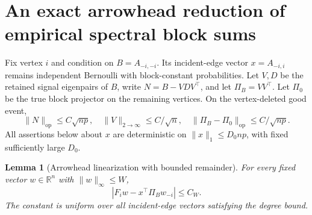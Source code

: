 \documentclass[11pt]{article}
\newtheorem{lemma}[theorem]{Lemma}
\newcommand{\op}{\mathrm{op}}
\begin{document}
\section{An exact arrowhead reduction of empirical spectral block sums}
Fix vertex $i$ and condition on $B=A_{-i,-i}$. Its incident-edge vector $x=A_{-i,i}$ remains independent Bernoulli with block-constant probabilities. Let $V,D$ be the retained signal eigenpairs of $B$, write $N=B-VDV^\top$, and let $\Pi_B=VV^\top$. Let $\Pi_0$ be the true block projector on the remaining vertices. On the vertex-deleted good event,
\[
 \|N\|_\op\le C\sqrt{np},\quad
 \|V\|_{2\to\infty}\le C/\sqrt n,\quad
 \|\Pi_B-\Pi_0\|_\op\le C/\sqrt{np}.
\]
All assertions below about $x$ are deterministic on $\|x\|_1\le D_0np$, with fixed sufficiently large $D_0$.

\begin{lemma}[Arrowhead linearization with bounded remainder]\label{lem:arrowhead}
For every fixed vector $w\in\mathbb R^n$ with $\|w\|_\infty\le W$,
\begin{equation}\label{eq:arrowhead}
 \left|F_iw-x^\top\Pi_B w_{-i}\right|\le C_W.
\end{equation}
The constant is uniform over all incident-edge vectors satisfying the degree bound.
\end{lemma}
\end{document}
